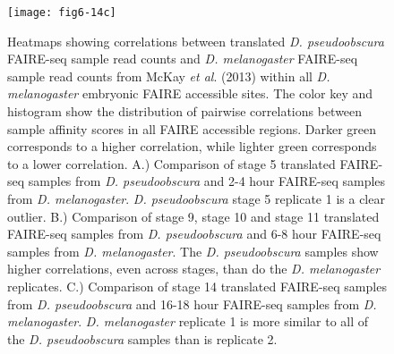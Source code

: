 \begin{figure}[H]
\centering
\texttt{[image: fig6-14c]}
\caption[Correlations between translated \emph{D. pseudoobscura} FAIRE-seq sample read counts and \emph{D. melanogaster} FAIRE-seq sample read counts from McKay \emph{et al}. (2013) within all \emph{D. melanogaster} embryonic FAIRE accessible sites]{Heatmaps showing correlations between translated \emph{D. pseudoobscura} FAIRE-seq sample read counts and \emph{D. melanogaster} FAIRE-seq sample read counts from McKay \emph{et al}. (2013) within all \emph{D. melanogaster} embryonic FAIRE accessible sites. The color key and histogram show the distribution of pairwise correlations between sample affinity scores in all FAIRE accessible regions. Darker green corresponds to a higher correlation, while lighter green corresponds to a lower correlation. A.) Comparison of stage 5 translated FAIRE-seq samples from \emph{D. pseudoobscura} and 2-4 hour FAIRE-seq samples from \emph{D. melanogaster}. \emph{D. pseudoobscura} stage 5 replicate 1 is a clear outlier. B.) Comparison of stage 9, stage 10 and stage 11 translated FAIRE-seq samples from \emph{D. pseudoobscura} and 6-8 hour FAIRE-seq samples from \emph{D. melanogaster}. The \emph{D. pseudoobscura} samples show higher correlations, even across stages, than do the \emph{D. melanogaster} replicates. C.) Comparison of stage 14 translated FAIRE-seq samples from \emph{D. pseudoobscura} and 16-18 hour FAIRE-seq samples from \emph{D. melanogaster}. \emph{D. melanogaster} replicate 1 is more similar to all of the \emph{D. pseudoobscura} samples than is replicate 2.}
\label{Figure 6.14}
\end{figure}

